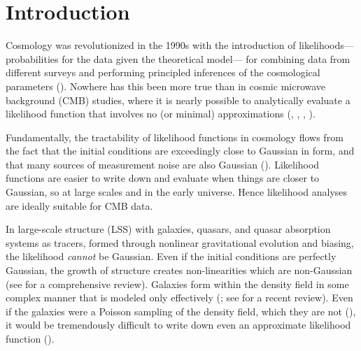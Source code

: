 

\section{Introduction}

Cosmology was revolutionized in the 1990s with the introduction of likelihoods---%
pro\-ba\-bil\-ities for the data given the theoretical model---%
for combining data from different surveys and performing principled inferences of
the cosmological parameters (\citealt{White:1996aa, Riess:1998aa}). 
Nowhere has this been more true than in cosmic microwave background (CMB) studies,
where it is nearly possible to analytically evaluate a likelihood function that
involves no (or minimal) approximations (\citealt{Oh:1999aa}, \citealt{Wandelt:2004aa},  
\citealt{Eriksen:2004aa}, \citealt{planckI, planckII}). 

Fundamentally, the tractability of likelihood functions in cosmology flows from
the fact that the initial conditions are exceedingly close to Gaussian in form,
and that many sources of measurement noise are also Gaussian (\citealt{Knox:1995aa}).
Likelihood functions are easier to write down and evaluate when things are closer 
to Gaussian, so at large scales and in the early universe. Hence likelihood analyses 
are ideally suitable for CMB data. 

In large-scale structure (LSS) with galaxies, quasars, and quasar absorption systems as tracers,
formed through nonlinear gravitational evolution and biasing, the likelihood {\em cannot} be Gaussian. 
Even if the initial conditions are perfectly Gaussian, the growth of structure creates non-linearities 
which are non-Gaussian (see \citealt{Bernardeau:2002aa} for a comprehensive review). 
Galaxies form within the density field in some complex manner that is modeled only effectively
(\citealt{Dressler:1980aa, Kaiser:1984aa, Santiago:1992aa, Steidel:1998aa}; see \citealt{somerville15} for a recent review).  
Even if the galaxies were a Poisson sampling of the density field, which they are not (\citealt{Mo:1996aa, Sommerville:2001aa, Casas-Miranda:2002aa}), it would be tremendously difficult to write down even 
an approximate likelihood function (\citealt{devpois}).

